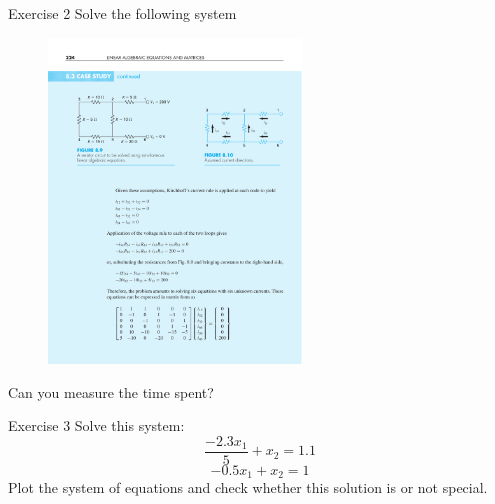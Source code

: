 \documentclass[xcolor=svgnames,t,10pt,allowframebreaks]{beamer}
\begin{document}
\begin{frame}[label={sec:org93a0e53}]{Exercise 2}
Solve the following system\\
\begin{figure}[H]

\includegraphics[width=0.6\textwidth]{fig/linear-example-02.pdf}
\end{figure}

Can you measure the time spent?
\end{frame}
\begin{frame}[label={sec:org1e9e864}]{Exercise 3}
\vfill\vfill
Solve this system: 
$$ \frac{-2.3x_1}{5} + x_2 = 1.1 $$
$$-0.5x_1 + x_2 = 1 $$
\vfill
Plot the system of equations and check whether this solution is or
not special.
\vfill
\end{frame}
\end{document}

